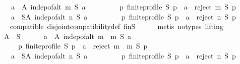 \begin{isabellebody}
\ \ \ \ \ \ {\isacharparenleft}{\kern0pt}{\isasymforall}a\ {\isasymin}\ A{\isachardot}{\kern0pt}\ indep{\isacharunderscore}{\kern0pt}of{\isacharunderscore}{\kern0pt}alt\ m\ S\ a\ {\isasymand}\isanewline
\ \ \ \ \ \ \ \ {\isacharparenleft}{\kern0pt}{\isasymforall}p{\isachardot}{\kern0pt}\ finite{\isacharunderscore}{\kern0pt}profile\ S\ p\ {\isasymlongrightarrow}\ a\ {\isasymin}\ reject\ m\ S\ p{\isacharparenright}{\kern0pt}{\isacharparenright}{\kern0pt}\ {\isasymand}\isanewline
\ \ \ \ \ \ {\isacharparenleft}{\kern0pt}{\isasymforall}a\ {\isasymin}\ S{\isacharminus}{\kern0pt}A{\isachardot}{\kern0pt}\ indep{\isacharunderscore}{\kern0pt}of{\isacharunderscore}{\kern0pt}alt\ n\ S\ a\ {\isasymand}\isanewline
\ \ \ \ \ \ \ \ {\isacharparenleft}{\kern0pt}{\isasymforall}p{\isachardot}{\kern0pt}\ finite{\isacharunderscore}{\kern0pt}profile\ S\ p\ {\isasymlongrightarrow}\ a\ {\isasymin}\ reject\ n\ S\ p{\isacharparenright}{\kern0pt}{\isacharparenright}{\kern0pt}{\isachardoublequoteclose}\isanewline
\ \ \ \ \isamarkupfalse%
\ compatible\ disjoint{\isacharunderscore}{\kern0pt}compatibility{\isacharunderscore}{\kern0pt}def\ fin{\isacharunderscore}{\kern0pt}S\isanewline
\ \ \ \ \isamarkupfalse%
\ {\isacharparenleft}{\kern0pt}metis\ {\isacharparenleft}{\kern0pt}no{\isacharunderscore}{\kern0pt}types{\isacharcomma}{\kern0pt}\ lifting{\isacharparenright}{\kern0pt}{\isacharparenright}{\kern0pt}\isanewline
\ \ \isamarkupfalse%
\isanewline
\ \ \ \ {\isachardoublequoteopen}{\isasymexists}A\ {\isasymsubseteq}\ S{\isachardot}{\kern0pt}\isanewline
\ \ \ \ \ \ {\isacharparenleft}{\kern0pt}{\isasymforall}a\ {\isasymin}\ A{\isachardot}{\kern0pt}\ indep{\isacharunderscore}{\kern0pt}of{\isacharunderscore}{\kern0pt}alt\ {\isacharparenleft}{\kern0pt}m\ {\isasymtriangleright}\ m{}{\isacharparenright}{\kern0pt}\ S\ a\ {\isasymand}\isanewline
\ \ \ \ \ \ \ \ {\isacharparenleft}{\kern0pt}{\isasymforall}p{\isachardot}{\kern0pt}\ finite{\isacharunderscore}{\kern0pt}profile\ S\ p\ {\isasymlongrightarrow}\ a\ {\isasymin}\ reject\ {\isacharparenleft}{\kern0pt}m\ {\isasymtriangleright}\ m{}{\isacharparenright}{\kern0pt}\ S\ p{\isacharparenright}{\kern0pt}{\isacharparenright}{\kern0pt}\ {\isasymand}\isanewline
\ \ \ \ \ \ {\isacharparenleft}{\kern0pt}{\isasymforall}a\ {\isasymin}\ S{\isacharminus}{\kern0pt}A{\isachardot}{\kern0pt}\ indep{\isacharunderscore}{\kern0pt}of{\isacharunderscore}{\kern0pt}alt\ n\ S\ a\ {\isasymand}\isanewline
\ \ \ \ \ \ \ \ {\isacharparenleft}{\kern0pt}{\isasymforall}p{\isachardot}{\kern0pt}\ finite{\isacharunderscore}{\kern0pt}profile\ S\ p\ {\isasymlongrightarrow}\ a\ {\isasymin}\ reject\ n\ S\ p{\isacharparenright}{\kern0pt}{\isacharparenright}{\kern0pt}{\isachardoublequoteclose}\isanewline

\end{isabellebody}
